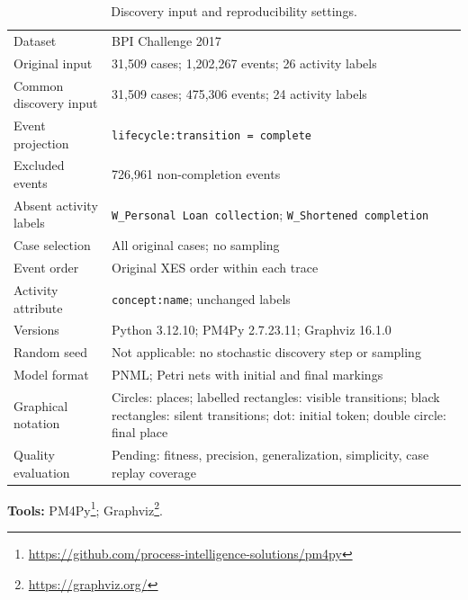 \begin{table}[h!]
\centering
\caption{Discovery input and reproducibility settings.}
\label{tab:discovery-input}
\begin{tabular}{@{}lp{}@{}}
\toprule
Dataset & BPI Challenge 2017~\cite{vanDongen2017BPIC} \\
Original input & 31,509 cases; 1,202,267 events; 26 activity labels \\
Common discovery input & 31,509 cases; 475,306 events; 24 activity labels \\
Event projection & \texttt{lifecycle:transition = complete} \\
Excluded events & 726,961 non-completion events \\
Absent activity labels & \texttt{W\_Personal Loan collection}; \texttt{W\_Shortened completion}\textvisiblespace \\
Case selection & All original cases; no sampling \\
Event order & Original XES order within each trace \\
Activity attribute & \texttt{concept:name}; unchanged labels \\
Versions & Python 3.12.10; PM4Py 2.7.23.11; Graphviz 16.1.0 \\
Random seed & Not applicable: no stochastic discovery step or sampling \\
Model format & PNML; Petri nets with initial and final markings \\
Graphical notation & Circles: places; labelled rectangles: visible transitions; black rectangles: silent transitions; dot: initial token; double circle: final place \\
Quality evaluation & Pending: fitness, precision, generalization, simplicity, case replay coverage \\
\bottomrule
\end{tabular}
\end{table}
\noindent\textbf{Tools:} PM4Py\footnote{\url{https://github.com/process-intelligence-solutions/pm4py}}; Graphviz\footnote{\url{https://graphviz.org/}}.


